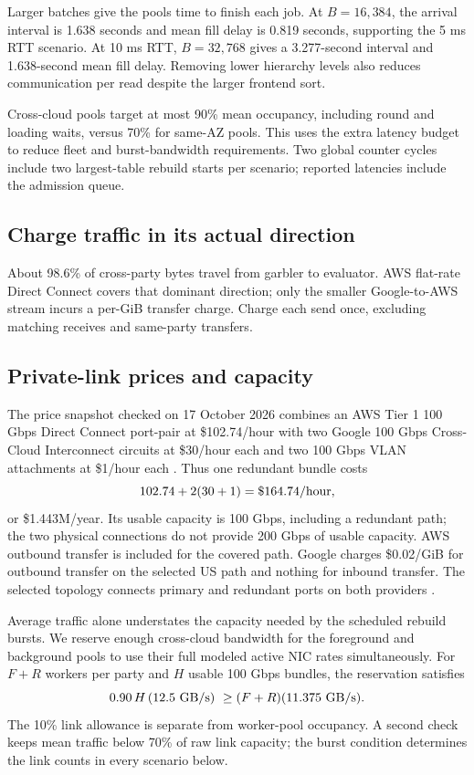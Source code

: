 \documentclass[11pt]{article}
\begin{document}
Larger batches give the pools time to finish each job. At $B=16{,}384$,
the arrival interval is 1.638 seconds and mean fill delay is 0.819 seconds,
supporting the 5 ms RTT scenario. At 10 ms RTT, $B=32{,}768$ gives a
3.277-second interval and 1.638-second mean fill delay. Removing lower
hierarchy levels also reduces communication per read despite the larger
frontend sort.

Cross-cloud pools target at most 90\% mean occupancy, including round and
loading waits, versus 70\% for same-AZ pools. This uses the extra latency
budget to reduce fleet and burst-bandwidth requirements. Two global
counter cycles include two largest-table rebuild starts per scenario;
reported latencies include the admission queue.

\subsection{Charge traffic in its actual direction}
About 98.6\% of cross-party bytes travel from garbler to evaluator.
AWS flat-rate Direct Connect covers that dominant direction; only the
smaller Google-to-AWS stream incurs a per-GiB transfer charge. Charge each
send once, excluding matching receives and same-party transfers.


\clearpage
\subsection{Private-link prices and capacity}
The price snapshot checked on 17 October 2026 combines an AWS Tier 1
100 Gbps Direct Connect port-pair at \$102.74/hour with two Google
100 Gbps Cross-Cloud Interconnect circuits at \$30/hour each and two
100 Gbps VLAN attachments at \$1/hour each
\cite{aws-flat-rate,gcp-interconnect}. Thus one redundant bundle costs
\[
 102.74+2(30+1)=\$164.74/{\rm hour},
\]
or \$1.443M/year. Its usable capacity is 100 Gbps, including a redundant
path; the two physical connections do not provide 200 Gbps of usable
capacity. AWS outbound transfer is included for the covered path. Google
charges \$0.02/GiB for outbound transfer on the selected US path and
nothing for inbound transfer. The selected topology connects primary
and redundant ports on both providers \cite{gcp-cci-topology}.

Average traffic alone understates the capacity needed by the scheduled
rebuild bursts. We reserve enough cross-cloud bandwidth for the foreground
and background pools to use their full modeled active NIC rates
simultaneously. For $F+R$ workers per party and $H$ usable 100 Gbps bundles,
the reservation satisfies
\[
 0.90\,H\,(12.5\ {\rm GB/s})\ \geq
 (F+R)(11.375\ {\rm GB/s}).
\]
The 10\% link allowance is separate from worker-pool occupancy. A second
check keeps mean traffic below 70\% of raw link capacity; the burst
condition determines the link counts in every scenario below.
\end{document}
